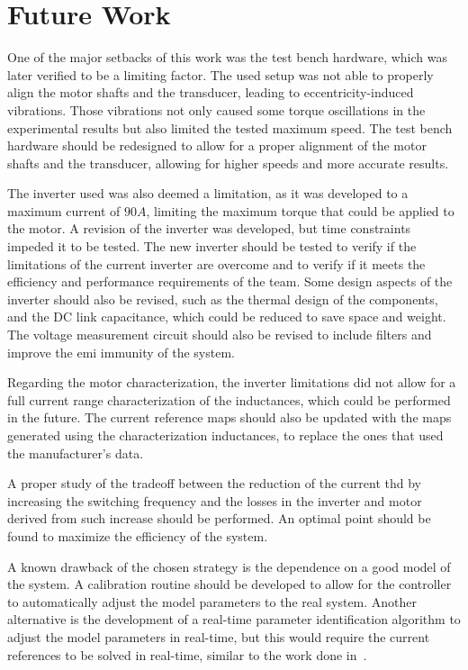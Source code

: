 \section{Future Work}
\label{section:future}

One of the major setbacks of this work was the test bench hardware, which was later verified to be a limiting factor. The used setup was not able to properly align the motor shafts and the transducer, leading to eccentricity-induced vibrations. Those vibrations not only caused some torque oscillations in the experimental results but also limited the tested maximum speed. The test bench hardware should be redesigned to allow for a proper alignment of the motor shafts and the transducer, allowing for higher speeds and more accurate results.

The inverter used was also deemed a limitation, as it was developed to a maximum current of $90A$, limiting the maximum torque that could be applied to the motor. A revision of the inverter was developed, but time constraints impeded it to be tested. The new inverter should be tested to verify if the limitations of the current inverter are overcome and to verify if it meets the efficiency and performance requirements of the team. Some design aspects of the inverter should also be revised, such as the thermal design of the components, and the DC link capacitance, which could be reduced to save space and weight. The voltage measurement circuit should also be revised to include filters and improve the \gls{emi} immunity of the system. 

Regarding the motor characterization, the inverter limitations did not allow for a full current range characterization of the inductances, which could be performed in the future. The current reference maps should also be updated with the maps generated using the characterization inductances, to replace the ones that used the manufacturer's data. 

A proper study of the tradeoff between the reduction of the current \gls{thd} by increasing the switching frequency and the losses in the inverter and motor derived from such increase should be performed. An optimal point should be found to maximize the efficiency of the system.

A known drawback of the chosen strategy is the dependence on a good model of the system. A calibration routine should be developed to allow for the controller to automatically adjust the model parameters to the real system. Another alternative is the development of a real-time parameter identification algorithm to adjust the model parameters in real-time, but this would require the current references to be solved in real-time, similar to the work done in~\cite{Jung:Online_MTPA_Ferrari:2013}.

